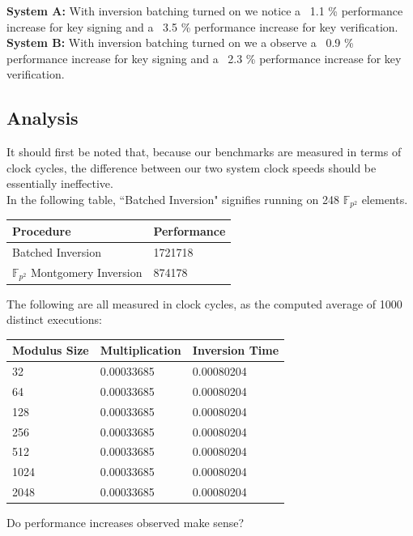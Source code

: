 \textbf{System A:} With inversion batching turned on we notice a ~1.1 \% performance increase for key signing and a ~3.5 \% performance increase for key verification.\\

\textbf{System B:} With inversion batching turned on we a observe a ~0.9 \% performance increase for key signing and a ~2.3 \% performance increase for key verification.\\

\subsection{Analysis}

It should first be noted that, because our benchmarks are measured in terms of clock cycles, the difference between our two system clock speeds should be essentially ineffective. \\

In the following table, ``Batched Inversion" signifies running  on 248 $\mathbb{F}_{p^{2}}$ elements.

\begin{center}
\begin{tabular}{@{}ll@{}}
	\toprule
	Procedure & Performance \\
	\midrule
	Batched Inversion & 1721718\\
	$\mathbb{F}_{p^{2}}$ Montgomery Inversion & 874178\\
	\bottomrule
\end{tabular}
\end{center}

The following are all measured in clock cycles, as the computed average of 1000 distinct executions:

\begin{center}
\begin{tabular}{@{}lll@{}}
	\toprule
	Modulus Size & Multiplication & Inversion Time \\
	\midrule
	32 & 0.00033685 & 0.00080204\\
	64 & 0.00033685 & 0.00080204\\
	128 & 0.00033685 & 0.00080204\\
	256 & 0.00033685 & 0.00080204\\
	512 & 0.00033685 & 0.00080204\\
	1024 & 0.00033685 & 0.00080204\\
	2048 & 0.00033685 & 0.00080204\\
	\bottomrule
\end{tabular}
\end{center}

Do performance increases observed make sense?\\